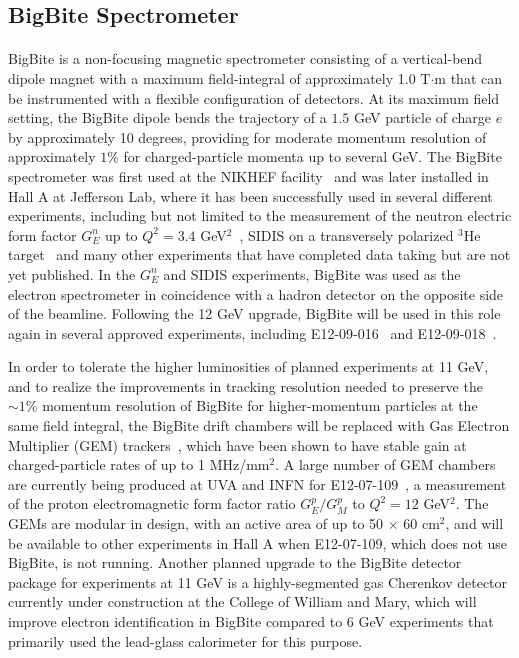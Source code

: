 \subsection{BigBite Spectrometer}
\paragraph{}
BigBite is a non-focusing magnetic spectrometer consisting of a vertical-bend dipole magnet with a maximum field-integral of approximately 1.0 T$\cdot$m that can be instrumented with a flexible configuration of detectors. At its maximum field setting, the BigBite dipole bends the trajectory of a $1.5$ GeV particle of charge $e$ by approximately 10 degrees, providing for moderate momentum resolution of approximately $1\%$ for charged-particle momenta up to several GeV. The BigBite spectrometer was first used at the NIKHEF facility~\cite{BigBite1998,BigBiteOptics1998} and was later installed in Hall A at Jefferson Lab, where it has been successfully used in several different experiments, including but not limited to the measurement of the neutron electric form factor $G_E^n$ up to $Q^2 = 3.4$ GeV$^2$~\cite{GEN2010}, SIDIS on a transversely polarized $^3$He target~\cite{E06010_AUT_PRL} and many other experiments that have completed data taking but are not yet published. In the $G_E^n$ and SIDIS experiments, BigBite was used as the electron spectrometer in coincidence with a hadron detector on the opposite side of the beamline. Following the 12 GeV upgrade, BigBite will be used in this role again in several approved experiments, including E12-09-016~\cite{GEN2} and E12-09-018~\cite{SBS_SIDIS}.

In order to tolerate the higher luminosities of planned experiments at 11 GeV, and to realize the improvements in tracking resolution needed to preserve the $\sim1\%$ momentum resolution of BigBite for higher-momentum particles at the same field integral, the BigBite drift chambers will be replaced with Gas Electron Multiplier (GEM) trackers~\cite{Sauli_GEM, GEM_test_1999}, which have been shown to have stable gain at charged-particle rates of up to 1 MHz/mm$^2$. A large number of GEM chambers are currently being produced at UVA and INFN for E12-07-109~\cite{GEP5}, a measurement of the proton electromagnetic form factor ratio $G_E^p/G_M^p$ to $Q^2 = 12$ GeV$^2$. The GEMs are modular in design, with an active area of up to 50 $\times$ 60 cm$^2$, and will be available to other experiments in Hall A when E12-07-109, which does not use BigBite, is not running. Another planned upgrade to the BigBite detector package for experiments at 11 GeV is a highly-segmented gas Cherenkov detector currently under construction at the College of William and Mary, which will improve electron identification in BigBite compared to 6 GeV experiments that primarily used the lead-glass calorimeter for this purpose.
